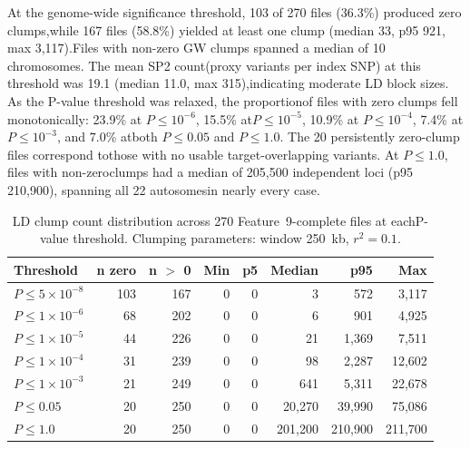 \documentclass[11pt,a4paper]{article}
\begin{document}
At the genome-wide significance threshold, 103 of 270 files (36.3\%) produced zero clumps,while 167 files (58.8\%) yielded at least one clump (median 33, p95 921, max 3,117).Files with non-zero GW clumps spanned a median of 10 chromosomes. The mean SP2 count(proxy variants per index SNP) at this threshold was 19.1 (median 11.0, max 315),indicating moderate LD block sizes. As the P-value threshold was relaxed, the proportionof files with zero clumps fell monotonically: 23.9\% at $P \leq 10^{-6}$, 15.5\% at$P \leq 10^{-5}$, 10.9\% at $P \leq 10^{-4}$, 7.4\% at $P \leq 10^{-3}$, and 7.0\% atboth $P \leq 0.05$ and $P \leq 1.0$. The 20 persistently zero-clump files correspond tothose with no usable target-overlapping variants. At $P \leq 1.0$, files with non-zeroclumps had a median of 205,500 independent loci (p95 210,900), spanning all 22 autosomesin nearly every case.

\begin{table}[h]
\centering
\caption{LD clump count distribution across 270 Feature~9-complete files at eachP-value threshold. Clumping parameters: window 250~kb, $r^{2} = 0.1$.}
\label{tab}
\begin{tabular}{lrrrrrrr}
\toprule
Threshold & n zero & n $>$ 0 & Min & p5 & Median & p95 & Max \\
\midrule
$P \leq 5\times10^{-8}$ & 103 & 167 & 0 & 0    & 3      & 572    & 3,117 \\
$P \leq 1\times10^{-6}$ & 68  & 202 & 0 & 0    & 6      & 901    & 4,925 \\
$P \leq 1\times10^{-5}$ & 44  & 226 & 0 & 0    & 21     & 1,369  & 7,511 \\
$P \leq 1\times10^{-4}$ & 31  & 239 & 0 & 0    & 98     & 2,287  & 12,602 \\
$P \leq 1\times10^{-3}$ & 21  & 249 & 0 & 0    & 641    & 5,311  & 22,678 \\
$P \leq 0.05$           & 20  & 250 & 0 & 0    & 20,270 & 39,990 & 75,086 \\
$P \leq 1.0$            & 20  & 250 & 0 & 0    & 201,200& 210,900& 211,700\\
\bottomrule
\end{tabular}
\end{table}
\end{document}
